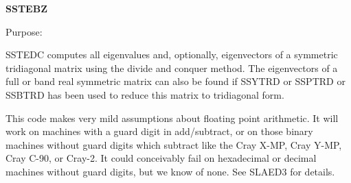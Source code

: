 {\bfseries S\+S\+T\+E\+B\+Z} 

 \begin{DoxyParagraph}{Purpose\+: }
\begin{DoxyVerb} SSTEDC computes all eigenvalues and, optionally, eigenvectors of a
 symmetric tridiagonal matrix using the divide and conquer method.
 The eigenvectors of a full or band real symmetric matrix can also be
 found if SSYTRD or SSPTRD or SSBTRD has been used to reduce this
 matrix to tridiagonal form.

 This code makes very mild assumptions about floating point
 arithmetic. It will work on machines with a guard digit in
 add/subtract, or on those binary machines without guard digits
 which subtract like the Cray X-MP, Cray Y-MP, Cray C-90, or Cray-2.
 It could conceivably fail on hexadecimal or decimal machines
 without guard digits, but we know of none.  See SLAED3 for details.\end{DoxyVerb}
 
\end{DoxyParagraph}


